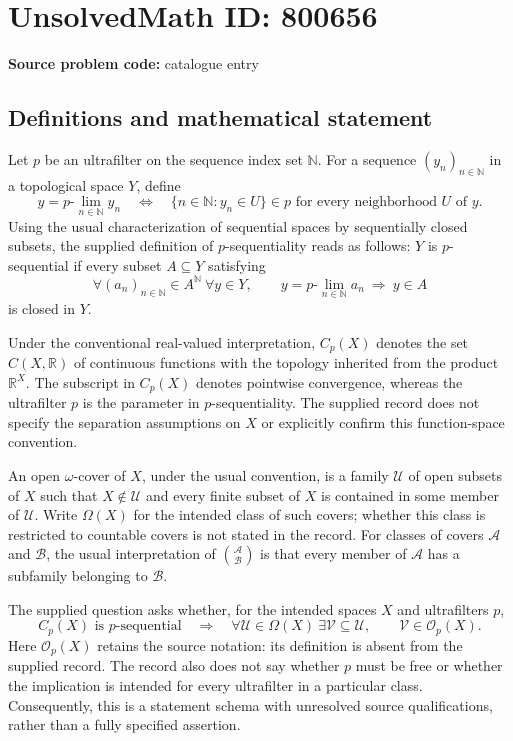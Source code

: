 \documentclass[11pt]{article}
\newcommand{\N}{\mathbb{N}}
\newcommand{\R}{\mathbb{R}}
\begin{document}
\section*{UnsolvedMath ID: 800656}
\textbf{Source problem code:} catalogue entry
\subsection{Definitions and mathematical statement}
Let \(p\) be an ultrafilter on the sequence index set \(\N\). For a sequence \((y_n)_{n\in\N}\) in a topological space \(Y\), define
\[
y=p\text{-}\lim_{n\in\N}y_n
\quad\Longleftrightarrow\quad
\{n\in\N:y_n\in U\}\in p
\text{ for every neighborhood }U\text{ of }y.
\]
Using the usual characterization of sequential spaces by sequentially closed subsets, the supplied definition of \(p\)-sequentiality reads as follows: \(Y\) is \(p\)-sequential if every subset \(A\subseteq Y\) satisfying
\[
\forall (a_n)_{n\in\N}\in A^{\N}\ \forall y\in Y,
\qquad y=p\text{-}\lim_{n\in\N}a_n\ \Longrightarrow\ y\in A
\]
is closed in \(Y\).

Under the conventional real-valued interpretation, \(C_p(X)\) denotes the set \(C(X,\R)\) of continuous functions with the topology inherited from the product \(\R^X\). The subscript in \(C_p(X)\) denotes pointwise convergence, whereas the ultrafilter \(p\) is the parameter in \(p\)-sequentiality. The supplied record does not specify the separation assumptions on \(X\) or explicitly confirm this function-space convention.

An open \(\omega\)-cover of \(X\), under the usual convention, is a family \(\mathcal U\) of open subsets of \(X\) such that \(X\notin\mathcal U\) and every finite subset of \(X\) is contained in some member of \(\mathcal U\). Write \(\Omega(X)\) for the intended class of such covers; whether this class is restricted to countable covers is not stated in the record. For classes of covers \(\mathscr A\) and \(\mathscr B\), the usual interpretation of \(\binom{\mathscr A}{\mathscr B}\) is that every member of \(\mathscr A\) has a subfamily belonging to \(\mathscr B\).

The supplied question asks whether, for the intended spaces \(X\) and ultrafilters \(p\),
\[
C_p(X)\text{ is }p\text{-sequential}
\quad\Longrightarrow\quad
\forall\mathcal U\in\Omega(X)\ \exists\mathcal V\subseteq\mathcal U,
\qquad \mathcal V\in\mathcal O_p(X).
\]
Here \(\mathcal O_p(X)\) retains the source notation: its definition is absent from the supplied record. The record also does not say whether \(p\) must be free or whether the implication is intended for every ultrafilter in a particular class. Consequently, this is a statement schema with unresolved source qualifications, rather than a fully specified assertion.
\end{document}
